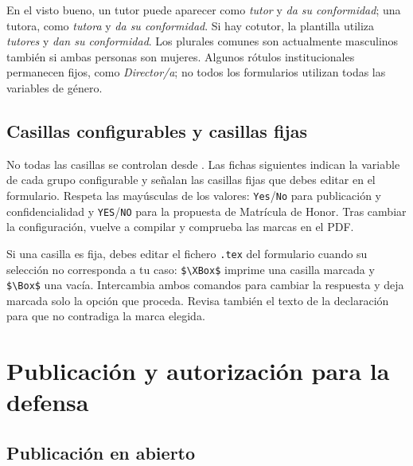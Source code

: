 \documentclass[10pt,a4paper]{article}
\newcommand{\fichero}[1]{\path{#1}}
\begin{document}
En el visto bueno, un tutor puede aparecer como \emph{tutor} y \emph{da su conformidad}; una tutora, como \emph{tutora} y \emph{da su conformidad}. Si hay cotutor, la plantilla utiliza \emph{tutores} y \emph{dan su conformidad}. Los plurales comunes son actualmente masculinos también si ambas personas son mujeres. Algunos rótulos institucionales permanecen fijos, como \emph{Director/a}; no todos los formularios utilizan todas las variables de género.

\subsection{Casillas configurables y casillas fijas}

No todas las casillas se controlan desde \fichero{Config/myconfig.tex}. Las fichas siguientes indican la variable de cada grupo configurable y señalan las casillas fijas que debes editar en el formulario. Respeta las mayúsculas de los valores: \texttt{Yes}/\texttt{No} para publicación y confidencialidad y \texttt{YES}/\texttt{NO} para la propuesta de Matrícula de Honor. Tras cambiar la configuración, vuelve a compilar y comprueba las marcas en el PDF.

Si una casilla es fija, debes editar el fichero \texttt{.tex} del formulario cuando su selección no corresponda a tu caso: \verb|$\XBox$| imprime una casilla marcada y \verb|$\Box$| una vacía. Intercambia ambos comandos para cambiar la respuesta y deja marcada solo la opción que proceda. Revisa también el texto de la declaración para que no contradiga la marca elegida.

\section{Publicación y autorización para la defensa}

\subsection{Publicación en abierto}\label{form:publicacion}
\end{document}

